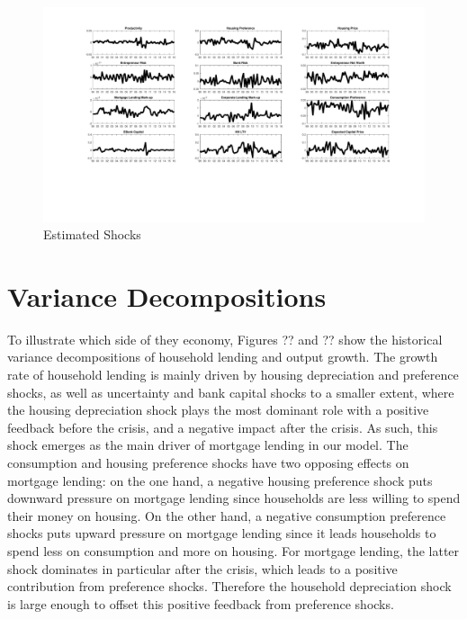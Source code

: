 \documentclass[12pt]{article}
\numberwithin{equation}{section}
\begin{document}
\begin{figure}
\centering
\caption{Estimated Shocks}
\label{estimated_shocks}
\includegraphics[scale=0.5]{smoothed_shocks.pdf}
\end{figure}


\FloatBarrier

\section*{Variance Decompositions}




To illustrate which side of they economy, Figures ?? and ?? show the historical variance decompositions of household lending and output growth. The growth rate of household lending is mainly driven by housing depreciation and preference shocks, as well as uncertainty and bank capital shocks to a smaller extent, where the housing depreciation shock plays the most dominant role with a positive feedback before the crisis, and a negative impact after the crisis. As such, this shock emerges as the main driver of mortgage lending in our model. The consumption and housing preference shocks have two opposing effects on mortgage lending: on the one hand, a negative housing preference shock puts downward pressure on mortgage lending since households are less willing to spend their money on housing. On the other hand, a negative consumption preference shocks puts upward pressure on mortgage lending since it leads households to spend less on consumption and more on housing. For mortgage lending, the latter shock dominates in particular after the crisis, which leads to a positive contribution from preference shocks. Therefore the household depreciation shock is large enough to offset this positive feedback from preference shocks. 
\end{document}
